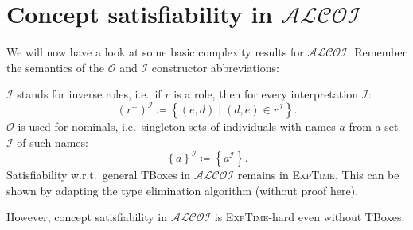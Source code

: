\newpage
\section{Concept satisfiability in $\mathcal{ALCOI}$}
We will now have a look at some basic complexity results for $\mathcal{ALCOI}$.
Remember the semantics of the $\mathcal{O}$ and $\mathcal{I}$ constructor abbreviations:

$\mathcal{I}$ stands for inverse roles, i.e.\ if $r$ is a role, then for every interpretation $\mathcal{I}$:
\[
	\left( r^- \right)^\mathcal{I} \coloneqq \left\{ (e,d) \mid (d,e) \in r^\mathcal{I} \right\}
.\]
$\mathcal{O}$ is used for nominals, i.e.\ singleton sets of individuals 
with names $a$ from a set $\mathscr{I}$ of such names:
\[
	\left\{ a \right\}^\mathcal{I} \coloneqq \left\{ a^\mathcal{I} \right\}
.\]
Satisfiability w.r.t.\ general TBoxes in $\mathcal{ALCOI}$ remains in \textsc{ExpTime}.
This can be shown by adapting the type elimination algorithm (without proof here).

However, concept satisfiability in $\mathcal{ALCOI}$ is \textsc{ExpTime}-hard even without TBoxes.

